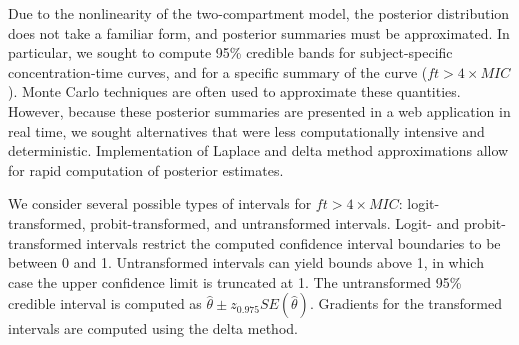 \documentclass{article}\usepackage[]{graphicx}\usepackage[]{color}
\newcommand{\mic}{$ft > 4 \times MIC$}
\begin{document}
Due to the nonlinearity of the two-compartment model, the posterior distribution does not take a familiar form, and posterior summaries must be approximated. In particular, we sought to compute 95\% credible bands for subject-specific concentration-time curves, and for a specific summary of the curve (\mic). Monte Carlo techniques are often used to approximate these quantities. However, because these posterior summaries are presented in a web application in real time, we sought alternatives that were less computationally intensive and deterministic. Implementation of Laplace and delta method approximations allow for rapid computation of posterior estimates.

We consider several possible types of intervals for \mic: logit-transformed, probit-transformed, and untransformed intervals. Logit- and probit-transformed intervals restrict the computed confidence interval boundaries to be between 0 and 1. Untransformed intervals can yield bounds above 1, in which case the upper confidence limit is truncated at 1. The untransformed 95\% credible interval is computed as $\hat{\theta} \pm z_{0.975} SE(\hat{\theta})$. Gradients for the transformed intervals are computed using the delta method.
\end{document}
